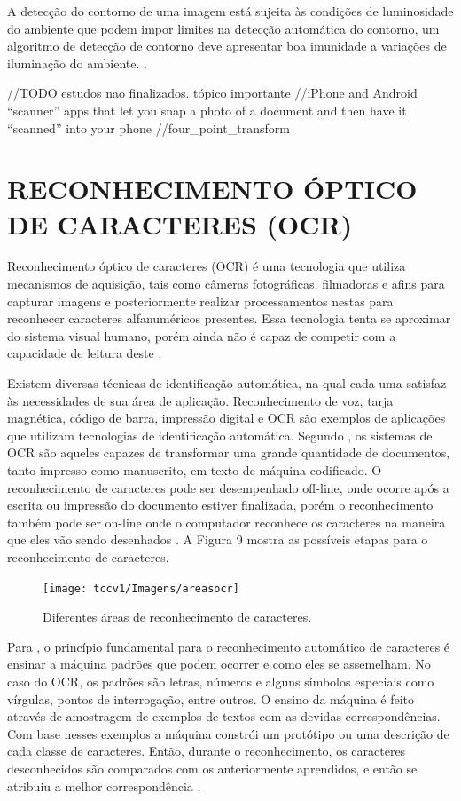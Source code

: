 A detecção do contorno de uma imagem está sujeita às condições de luminosidade do ambiente que podem impor limites na detecção automática do contorno, um algoritmo de detecção de contorno deve apresentar boa imunidade a variações de iluminação do ambiente. \cite{Pereira}.

//TODO estudos nao finalizados. tópico importante
//iPhone and Android “scanner” apps that let you snap a photo of a document and then have it “scanned” into your phone
//four_point_transform

\section{RECONHECIMENTO ÓPTICO DE CARACTERES (OCR)}
Reconhecimento óptico de caracteres (OCR) é uma tecnologia que utiliza mecanismos de aquisição, tais como câmeras fotográficas, filmadoras e afins para capturar imagens e posteriormente realizar processamentos nestas para reconhecer caracteres alfanuméricos presentes. Essa tecnologia tenta se aproximar do sistema visual humano, porém ainda não é capaz de competir com a capacidade de leitura deste \cite{Mithe2013}.

 Existem diversas técnicas de identificação automática, na qual cada uma satisfaz às necessidades de sua área de aplicação. Reconhecimento de voz, tarja magnética, código de barra, impressão digital e OCR são exemplos de aplicações que utilizam tecnologias de identificação automática. Segundo , os sistemas de OCR são aqueles capazes de transformar uma grande quantidade de documentos, tanto impresso como manuscrito, em texto de máquina codificado. O reconhecimento de caracteres pode ser desempenhado off-line, onde ocorre após a escrita ou impressão do documento estiver finalizada, porém o reconhecimento também pode ser on-line onde o computador reconhece os caracteres na maneira que eles vão sendo desenhados \cite{Eikvil1993}. A Figura 9 mostra as possíveis etapas para o reconhecimento de caracteres.

 \begin{figure}[h]
	\centering
	\texttt{[image: tccv1/Imagens/areasocr]} 
	\caption[Diferentes áreas de reconhecimento de caracteres.]{Diferentes áreas de reconhecimento de caracteres.}
	\label{fig:tux_laplace}
\end{figure}

Para , o princípio fundamental para o reconhecimento
automático de caracteres é ensinar a máquina padrões que podem ocorrer e como eles se assemelham. No caso do OCR, os padrões são letras, números e alguns símbolos especiais como vírgulas, pontos de interrogação, entre outros. O ensino da máquina é feito através de amostragem de exemplos de textos com as devidas correspondências.
Com base nesses exemplos a máquina constrói um protótipo ou uma
descrição de cada classe de caracteres. Então, durante o reconhecimento, os caracteres desconhecidos são comparados com os anteriormente aprendidos, e então se atribuiu a melhor correspondência \cite{Eikvil1993}.

